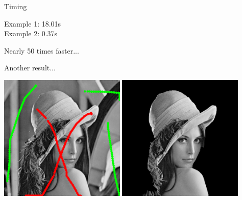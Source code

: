\documentclass[12pt]{beamer}
\begin{document}
\begin{frame}{Timing}

\begin{center}
\begin{minipage}{0.4\textwidth}
Example 1: 18.01s\\
Example 2: 0.37s

\vspace{0.05\textheight}

Nearly 50 times faster...
\end{minipage}
\end{center}
\end{frame}

\begin{frame}{Another result...}

\begin{center}
\includegraphics[width=0.45\textwidth]{initialisation2.png}
\hspace{0.04\textwidth}
\includegraphics[width=0.45\textwidth]{demo/graphcut2/segmentation2.png}
\end{center}

\end{frame}
\end{document}
